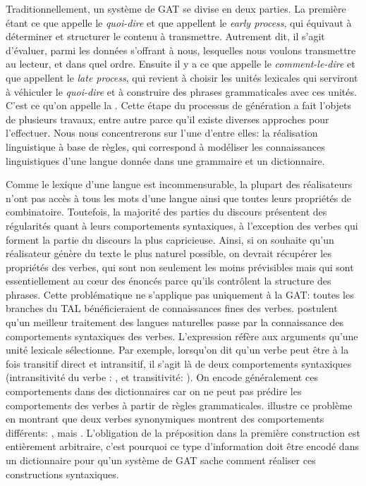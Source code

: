 Traditionnellement, un système de \ac{GAT} se divise en deux parties. La première étant ce que \cite{DanlosPresentationmodelegeneration1983} appelle le \emph{quoi-dire} et que \cite{gatt18} appellent le \emph{early process}, qui équivaut à déterminer et structurer le contenu à transmettre. Autrement dit, il s'agit d'évaluer, parmi les données s'offrant à nous, lesquelles nous voulons transmettre au lecteur, et dans quel ordre. Ensuite il y a ce que \citeauthor{DanlosPresentationmodelegeneration1983} appelle le \emph{comment-le-dire} et que \citeauthor{gatt18} appellent le \emph{late process}, qui revient à choisir les unités lexicales qui serviront à véhiculer le \emph{quoi-dire} et à construire des phrases grammaticales avec ces unités. C'est ce qu'on appelle la . Cette étape du processus de génération a fait l'objets de plusieurs travaux, entre autre parce qu'il existe diverses approches pour l'effectuer. Nous nous concentrerons sur l'une d'entre elles: la réalisation linguistique à base de règles, qui correspond à modéliser les connaissances linguistiques d'une langue donnée dans une grammaire et un dictionnaire.

Comme le lexique d'une langue est incommensurable, la plupart des réalisateurs n'ont pas accès à tous les mots d'une langue ainsi que toutes leurs propriétés de combinatoire. Toutefois, la majorité des parties du discours présentent des régularités quant à leurs comportements syntaxiques, à l'exception des verbes qui forment la partie du discours la plus capricieuse. Ainsi, si on souhaite qu'un réalisateur génère du texte le plus naturel possible, on devrait récupérer les propriétés des verbes, qui sont non seulement les moins prévisibles mais qui sont essentiellement au c\oe{}ur des énoncés parce qu'ils contrôlent la structure des phrases. Cette problématique ne s'applique pas uniquement à la \ac{GAT}: toutes les branches du \ac{TAL} bénéficieraient de connaissances fines des verbes. \cite{Korhonenlargesubcategorizationlexicon2006, SchulerVerbnetBroadcoverageComprehensive2005} postulent qu'un meilleur traitement des langues naturelles passe par la connaissance des comportements syntaxiques des verbes. L'expression  réfère aux arguments qu'une unité lexicale sélectionne. Par exemple, lorsqu'on dit qu'un verbe peut être à la fois transitif direct et intransitif, il s'agit là de deux comportements syntaxiques (intransitivité du verbe : , et transitivité: ). On encode généralement ces comportements dans des dictionnaires car on ne peut pas prédire les comportements des verbes à partir de règles grammaticales. \cite{MilicevicSchemaregimepont2009} illustre ce problème en montrant que deux verbes synonymiques montrent des comportements différents: , mais . L'obligation de la préposition dans la première construction est entièrement arbitraire, c'est pourquoi ce type d'information doit être encodé dans un dictionnaire pour qu'un système de \ac{GAT} sache comment réaliser ces constructions syntaxiques.

